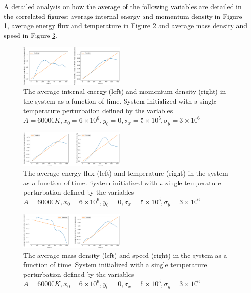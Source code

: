 \documentclass[10pt, nofootinbib, twocolumn]{revtex4-1}
\begin{document}
A detailed analysis on how the average of the following variables are detailed in the correlated figures; average internal energy and momentum density in Figure \ref{fig:e_rhov}, average energy flux and temperature in Figure \ref{fig:en_t} and average mass density and speed in Figure \ref{fig:rho_v}.
\begin{figure}[H]
    \centering
    \includegraphics[width = 0.47\textwidth]{figures/single_collage1.png} 
    \caption{The average internal energy (left) and momentum density (right) in the system as a function of time. System initialized with a single temperature perturbation defined by the variables $A=60000 K, x_0=6\times 10^6, y_0=0, \sigma_x=5\times 10^5, \sigma_y=3\times 10^6$}
    \label{fig:e_rhov}
\end{figure}
\begin{figure}[H]
    \centering
    \includegraphics[width = 0.47\textwidth]{figures/single_collage2.png} 
    \caption{The average energy flux (left) and temperature (right) in the system as a function of time. System initialized with a single temperature perturbation defined by the variables $A=60000 K, x_0=6\times 10^6, y_0=0, \sigma_x=5\times 10^5, \sigma_y=3\times 10^6$}
    \label{fig:en_t}
\end{figure}
\begin{figure}[H]
    \centering
    \includegraphics[width = 0.47\textwidth]{figures/single_collage3.png}
    \caption{The average mass density (left) and speed (right) in the system as a function of time. System initialized with a single temperature perturbation defined by the variables $A=60000 K, x_0=6\times 10^6, y_0=0, \sigma_x=5\times 10^5, \sigma_y=3\times 10^6$}
    \label{fig:rho_v}
\end{figure}
\end{document}
